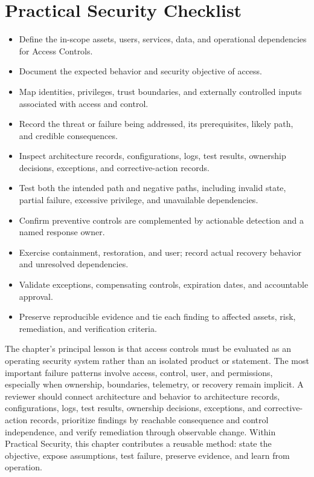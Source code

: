 \documentclass[11pt]{article}
\begin{document}
\section*{Practical Security Checklist}
\begin{itemize}[label=$\square$]
\item Define the in-scope assets, users, services, data, and operational dependencies for Access Controls.
\item Document the expected behavior and security objective of access.
\item Map identities, privileges, trust boundaries, and externally controlled inputs associated with access and control.
\item Record the threat or failure being addressed, its prerequisites, likely path, and credible consequences.
\item Inspect architecture records, configurations, logs, test results, ownership decisions, exceptions, and corrective-action records.
\item Test both the intended path and negative paths, including invalid state, partial failure, excessive privilege, and unavailable dependencies.
\item Confirm preventive controls are complemented by actionable detection and a named response owner.
\item Exercise containment, restoration, and user; record actual recovery behavior and unresolved dependencies.
\item Validate exceptions, compensating controls, expiration dates, and accountable approval.
\item Preserve reproducible evidence and tie each finding to affected assets, risk, remediation, and verification criteria.
\end{itemize}
\begin{synthesisbox}
The chapter's principal lesson is that access controls must be evaluated as an operating security system rather than an isolated product or statement. The most important failure patterns involve access, control, user, and permissions, especially when ownership, boundaries, telemetry, or recovery remain implicit. A reviewer should connect architecture and behavior to architecture records, configurations, logs, test results, ownership decisions, exceptions, and corrective-action records, prioritize findings by reachable consequence and control independence, and verify remediation through observable change. Within Practical Security, this chapter contributes a reusable method: state the objective, expose assumptions, test failure, preserve evidence, and learn from operation.
\end{synthesisbox}
\end{document}
